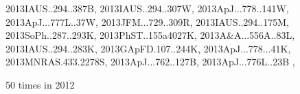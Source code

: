 \documentclass[12pt]{article}
\begin{document}
\begin{description}
{2013IAUS..294..387B,%
2013IAUS..294..307W,%
2013ApJ...778..141W,%
2013ApJ...777L..37W,%
2013JFM...729..309R,%
2013IAUS..294..175M,%
2013SoPh..287..293K,%
2013PhST..155a4027K,%
2013A&A...556A..83L,%
2013IAUS..294..283K,%
2013GApFD.107..244K,%
2013ApJ...778...41K,%
2013MNRAS.433.2278S,%
2013ApJ...762..127B,%
2013ApJ...776L..23B%
},\item
50 times in 2012 \citep{
2012sf2a.conf..329F,%
2012A&A...548A..49L,%
2012A&A...548A...1P,%
2012A&A...544A..32L,%
2012PhRvD..86j3005K,%
2012ApJ...759...54T,%
2012PhDT.......284G,%
2012MNRAS.426.1444G,%
2012MNRAS.426.1107L,%
2012MNRAS.426..784H,%
}
\end{description}
\end{document}
